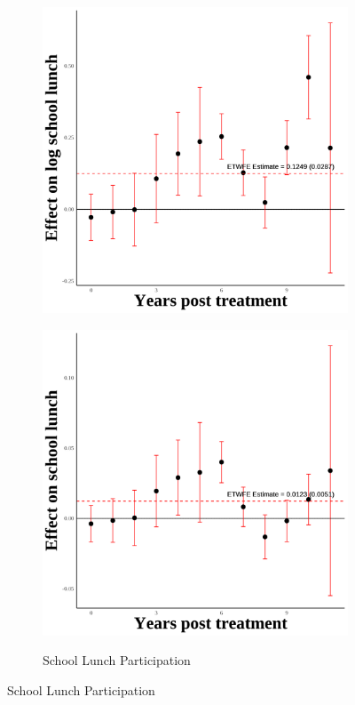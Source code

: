 \documentclass[12pt,english]{article}
\begin{document}
\begin{figure}[H]
\begin{subfigure}[b]{0.3\textwidth}
    \includegraphics[width=\linewidth]{figures/plot50-ln_schl_lunch_event_study-third.png}
    \label{fig:ln-schl-lunch-third}
  \end{subfigure}
  \hfill
  \begin{subfigure}[b]{0.3\textwidth}
    \centering
    \caption{School Lunch Participation}
    \includegraphics[width=\linewidth]{figures/plot51-schl_lunch_event_study-third.png}
    \label{fig:schl-lunch-third}
  \end{subfigure}


\end{figure}
\end{document}
